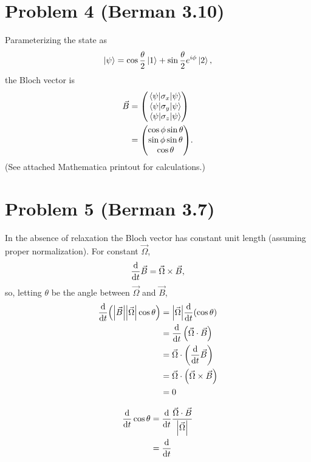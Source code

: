 \documentclass[12pt]{article}
\begin{document}
\section*{Problem 4 (Berman 3.10)}
Parameterizing the state as
\[ \ket{\psi} = \cos\frac{\theta}{2}\ket{1} + \sin\frac{\theta}{2}e^{i\phi}\ket{2}, \]
the Bloch vector is
\begin{align*}
    \vec{B} &= \mqty(\mel{\psi}{\sigma_x}{\psi} \\ \mel{\psi}{\sigma_y}{\psi} \\ \mel{\psi}{\sigma_z}{\psi}) \\
    &= \mqty(\cos\phi\sin\theta\\\sin\phi\sin\theta\\\cos\theta).
\end{align*}
(See attached Mathematica printout for calculations.)

\section*{Problem 5 (Berman 3.7)}
In the absence of relaxation the Bloch vector has constant unit length (assuming proper normalization). For constant $\vec{\Omega}$,
\[ \dv{t}\vec{B} = \vec{\Omega}\times\vec{B}, \]
so, letting $\theta$ be the angle between $\vec\Omega$ and $\vec{B}$,
\begin{align*}
    \dv{t}(\abs{\vec{B}}\abs{\vec\Omega}\cos\theta) &= \abs{\vec\Omega}\dv{t}(\cos\theta) \\
    &= \dv{t}\left(\vec\Omega\cdot\vec{B}\right) \\
    &= \vec\Omega\cdot\left(\dv{t}\vec{B}\right) \\
    &= \vec\Omega\cdot\left(\vec{\Omega}\times\vec{B}\right) \\
    &= 0
\end{align*}

\begin{align*}
    \dv{t}\cos\theta &= \dv{t}\frac{\vec\Omega\cdot\vec{B}}{\abs{\vec\Omega}} \\
    &= \dv{t}
\end{align*}


\end{document}
